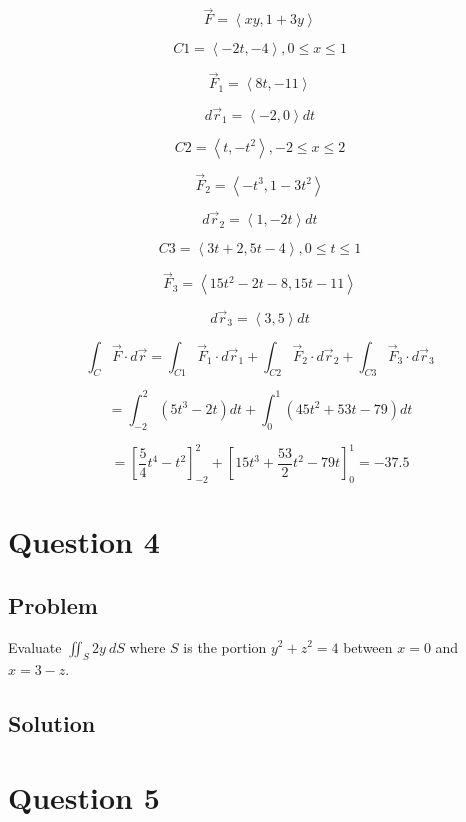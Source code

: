 \documentclass[12pt]{article}
\begin{document}
\[
    \vec{F} = \left\langle xy, 1 + 3y\right\rangle
\]

\[
    C1 = \left\langle -2t, -4\right\rangle, 0 \leq x \leq 1
\]

\[
    \vec{F}_1 = \left\langle 8t, -11 \right\rangle
\]

\[
    d \vec{r}_1 = \left\langle -2, 0\right\rangle d t
\]

\[
    C2 = \left\langle t, -t^2\right\rangle, -2 \leq x \leq 2
\]

\[
    \vec{F}_2 = \left\langle -t^3, 1 - 3t^2\right\rangle
\]

\[
    d \vec{r}_2 = \left\langle 1, -2t\right\rangle d t
\]

\[
    C3 = \left\langle 3t + 2, 5t -4\right\rangle, 0 \leq t \leq 1
\]

\[
    \vec{F}_3 = \left\langle 15t^2 - 2t - 8, 15t - 11\right\rangle
\]

\[
    d \vec{r}_3 = \left\langle 3, 5\right\rangle d t
\]

\[
    \int_C \vec{F} \cdot d \vec{r}
    = \int_{C1} \vec{F}_1 \cdot d \vec{r}_1
    + \int_{C2} \vec{F}_2 \cdot d \vec{r}_2
    + \int_{C3} \vec{F}_3 \cdot d \vec{r}_3
\]

\[
    = \int_{-2}^{2} \left(5t^3 - 2t\right) d t
    + \int_{0}^{1} \left(45t^2 + 53t - 79\right) d t
\]

\[
    = \left[\frac{5}{4} t^4 - t^2\right]_{-2}^{2}
    + \left[15t^3 + \frac{53}{2} t^2 - 79t\right]_{0}^{1}
    = -37.5
\]

\newpage
\section{Question 4}

\subsection{Problem}

Evaluate \(\iint_S 2y\ dS\) where \(S\) is the portion \(y^2 + z^2 = 4\) between \(x = 0\)
and \(x = 3 - z\).

\subsection{Solution}



\newpage
\section{Question 5}
\end{document}
